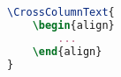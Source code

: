 \begin{lstlisting}[language=LaTeX]
\CrossColumnText{
    \begin{align}
        ...
    \end{align}
}
\end{lstlisting}